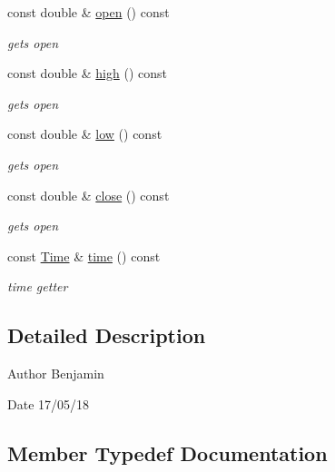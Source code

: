 \begin{DoxyCompactItemize}
const double \& \hyperlink{classMarketBar_a2d0ebff20fd2d65f1b85da9ce7f5a836}{open} () const
\begin{DoxyCompactList}\small\item\em gets open \end{DoxyCompactList}\item 
const double \& \hyperlink{classMarketBar_a77bb9fef6fe9ba65f1b0c7cc0e94a6b7}{high} () const
\begin{DoxyCompactList}\small\item\em gets open \end{DoxyCompactList}\item 
const double \& \hyperlink{classMarketBar_aa1d4769489e2ce450d7e376fdfcb6ef4}{low} () const
\begin{DoxyCompactList}\small\item\em gets open \end{DoxyCompactList}\item 
const double \& \hyperlink{classMarketBar_a74369b5be9dd83b2410e2bc3e50b8437}{close} () const
\begin{DoxyCompactList}\small\item\em gets open \end{DoxyCompactList}\item 
const \hyperlink{classMarketBar_a0d7dabe1fd00e674ef72f54bb1ff9ad0}{Time} \& \hyperlink{classMarketBar_aa49e0b737dca9bd90d119ed354f091e4}{time} () const
\begin{DoxyCompactList}\small\item\em time getter \end{DoxyCompactList}\end{DoxyCompactItemize}


\subsection{Detailed Description}
\begin{DoxyAuthor}{Author}
Benjamin 
\end{DoxyAuthor}
\begin{DoxyDate}{Date}
17/05/18 
\end{DoxyDate}


\subsection{Member Typedef Documentation}
\mbox{\label{classMarketBar_a0d7dabe1fd00e674ef72f54bb1ff9ad0}} 
